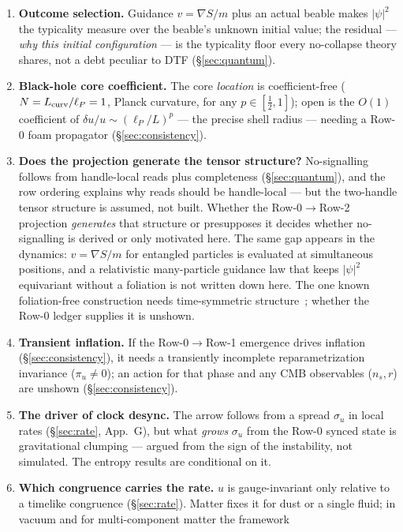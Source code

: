 \documentclass[11pt]{article}
\begin{document}
\begin{enumerate}[leftmargin=1.9em,itemsep=2pt,topsep=2pt,label=\textbf{O\arabic*.}]
\item \textbf{Outcome selection.} Guidance $v=\nabla S/m$ plus an actual beable makes $|\psi|^2$ the typicality
measure over the beable's unknown initial value; the residual --- \emph{why this initial configuration} --- is
the typicality floor every no-collapse theory shares, not a debt peculiar to DTF (\S\ref{sec:quantum}).
\item \textbf{Black-hole core coefficient.} The core \emph{location} is coefficient-free ($N=L_{\rm
curv}/\ell_P=1$, Planck curvature, for any $p\in[\tfrac12,1]$); open is the $O(1)$ coefficient of
$\delta u/u\sim(\ell_P/L)^p$ --- the precise shell radius --- needing a Row-0 foam propagator (\S\ref{sec:consistency}).
\item \textbf{Does the projection generate the tensor structure?} No-signalling follows from
handle-local reads plus completeness (\S\ref{sec:quantum}), and the row ordering explains why reads should be
handle-local --- but the two-handle tensor structure is assumed, not built. Whether the
Row-0$\to$Row-2 projection \emph{generates} that structure or presupposes it decides whether
no-signalling is derived or only motivated here. The same gap appears in the dynamics: $v=\nabla S/m$ for
entangled particles is evaluated at simultaneous positions, and a relativistic many-particle guidance law
that keeps $|\psi|^2$ equivariant without a foliation is not written down here. The one known foliation-free
construction needs time-symmetric structure~\cite{GoldsteinTumulka2003}; whether the Row-0 ledger supplies it
is unshown.
\item \textbf{Transient inflation.} If the Row-0$\to$Row-1 emergence drives inflation (\S\ref{sec:consistency}), it needs a
transiently incomplete reparametrization invariance ($\pi_u\neq0$); an action for that phase and any CMB
observables ($n_s,r$) are unshown (\S\ref{sec:consistency}).
\item \textbf{The driver of clock desync.} The arrow follows from a spread $\sigma_u$ in local rates
(\S\ref{sec:rate}, App.~G), but what \emph{grows} $\sigma_u$ from the Row-0 synced state is gravitational clumping ---
argued from the sign of the instability, not simulated. The entropy results are conditional on it.
\item \textbf{Which congruence carries the rate.} $u$ is gauge-invariant only relative to a timelike congruence
(\S\ref{sec:rate}). Matter fixes it for dust or a single fluid; in vacuum and for multi-component matter the framework

\end{enumerate}
\end{document}
